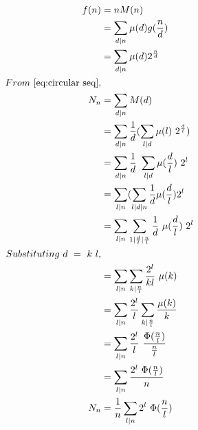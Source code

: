 \begin{align}
    f(n) &= nM(n) \nonumber \\
    &= \sum_{d|n}\mu(d)g(\frac{n}{d}) \nonumber\\
    &= \sum_{d|n}\mu(d)2^{\frac{n}{d}}  \nonumber\\
From~ \ref{eq:circular seq},  \nonumber\\
    N_n &= \sum_{d|n}M(d)  \nonumber\\
    &= \sum_{d|n} \frac{1}{d}(\sum_{l|d}\mu(l)~2^{\frac{d}{l}}) \nonumber\\
    &= \sum_{d|n} \frac{1}{d}~\sum_{l|d}\mu(\frac{d}{l})~2^l \nonumber\\
    &= \sum_{l|n}(\sum_{l|d|n}\frac{1}{d}\mu(\frac{d}{l})2^l \nonumber\\
     &= \sum_{l|n}\sum_{1|{\frac{d}{l}}|{\frac{n}{l}}}\frac{1}{d}~\mu(\frac{d}{l})~2^l\nonumber \nonumber\\
    Substituting ~d~=~k~l, \nonumber \\
     &= \sum_{l|n}\sum_{k|{\frac{n}{l}}}\frac{2^l}{kl}~\mu(k)\nonumber\\
    &= \sum_{l|n}\frac{2^l}{l}\sum_{k|{\frac{n}{l}}}\frac{\mu(k)}{k} \nonumber\\
    &= \sum_{l|n}\frac{2^l}{l}~\frac{\Phi(\frac{n}{l})}{\frac{n}{l}}\nonumber\\
    &= \sum_{l|n}\frac{2^l~\Phi(\frac{n}{l})}{n} \nonumber\\
    N_n &= \frac{1}{n}\sum_{l|n}2^l~\Phi(\frac{n}{l}) \nonumber
\end{align}








































